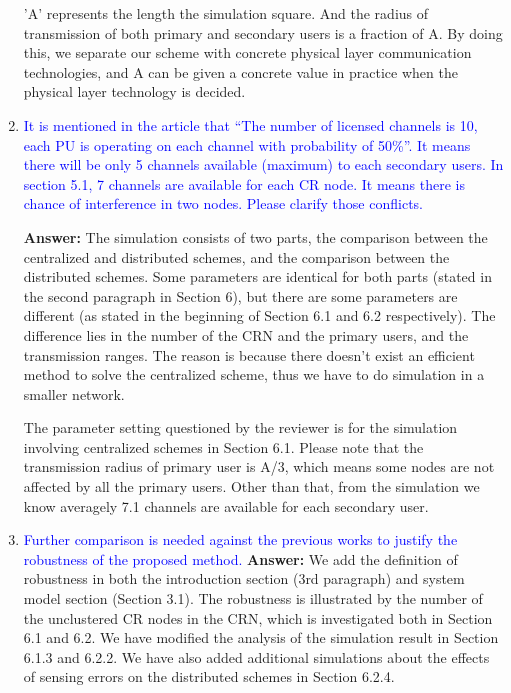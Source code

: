 \documentclass[10pt,a4paper]{article}
\begin{document}
\begin{enumerate}
 'A' represents the length the simulation square.
    And the radius of transmission of both primary and secondary users is a fraction of A.
    By doing this, we separate our scheme with concrete physical layer communication technologies, and A can be given a concrete value in practice when the physical layer technology is decided.
    
\item \textcolor{blue}{ It is mentioned in the article that “The number of licensed channels is 10, each PU is operating on each channel with probability of 50\%”. It means there will be only 5 channels available (maximum) to each secondary users. In section 5.1, 7 channels are available for each CR node. It means there is chance of interference in two nodes. Please clarify those conflicts.}

\textbf{Answer:} 
The simulation consists of two parts, the comparison between the centralized and distributed schemes, and the comparison between the distributed schemes.
Some parameters are identical for both parts (stated in the second paragraph in Section 6), but there are some parameters are different (as stated in the beginning of Section 6.1 and 6.2 respectively).
The difference lies in the number of the CRN and the primary users, and the transmission ranges.
The reason is because there doesn't exist an efficient method to solve the centralized scheme, thus we have to do simulation in a smaller network.

The parameter setting questioned by the reviewer is for the simulation involving centralized schemes in Section 6.1.
    Please note that the transmission radius of primary user is A/3, which means some nodes are not affected by all the primary users.
    Other than that, from the simulation we know averagely 7.1 channels are available for each secondary user.
    
\item \textcolor{blue}{ Further comparison is needed against the previous works to justify the robustness of the proposed method.}
\textbf{Answer:} 	We add the definition of robustness in both the introduction section (3rd paragraph) and system model section (Section 3.1).
The robustness is illustrated by the number of the unclustered CR nodes in the CRN, which is investigated both in Section 6.1 and 6.2.
We have modified the analysis of the simulation result in Section 6.1.3 and 6.2.2.
We have also added additional simulations about the effects of sensing errors on the distributed schemes in Section 6.2.4.

\end{enumerate}
\end{document}
